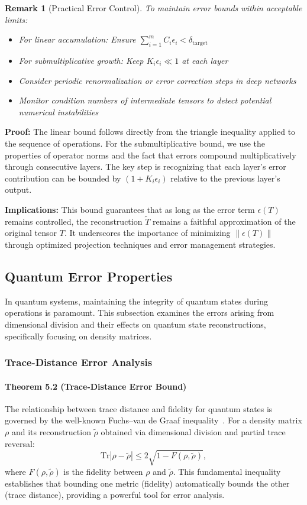 \documentclass[sn-mathphys-num]{sn-jnl}
\theoremstyle{thmstyleone}
\theoremstyle{thmstyletwo}
\newtheorem{remark}{Remark}
\theoremstyle{thmstylethree}
\begin{document}
\begin{remark}[Practical Error Control]
To maintain error bounds within acceptable limits:
\begin{itemize}
    \item For linear accumulation: Ensure $\sum_{i=1}^m C_i \epsilon_i < \delta_{\text{target}}$
    \item For submultiplicative growth: Keep $K_i\epsilon_i \ll 1$ at each layer
    \item Consider periodic renormalization or error correction steps in deep networks
    \item Monitor condition numbers of intermediate tensors to detect potential numerical instabilities
\end{itemize}
\end{remark}

\textbf{Proof:} The linear bound follows directly from the triangle inequality applied to the sequence of operations. For the submultiplicative bound, we use the properties of operator norms and the fact that errors compound multiplicatively through consecutive layers. The key step is recognizing that each layer's error contribution can be bounded by $(1 + K_i\epsilon_i)$ relative to the previous layer's output.

\textbf{Implications:} This bound guarantees that as long as the error term $\epsilon(T)$ remains controlled, the reconstruction $\tilde{T}$ remains a faithful approximation of the original tensor $T$. It underscores the importance of minimizing $\|\epsilon(T)\|$ through optimized projection techniques and error management strategies.

\subsection{Quantum Error Properties}

In quantum systems, maintaining the integrity of quantum states during operations is paramount. This subsection examines the errors arising from dimensional division and their effects on quantum state reconstructions, specifically focusing on density matrices.

\subsubsection{Trace-Distance Error Analysis}
\paragraph{Theorem 5.2 (Trace-Distance Error Bound)}
The relationship between trace distance and fidelity for quantum states is governed by the well-known Fuchs--van de Graaf inequality~\cite{fuchs1999cryptographic}. For a density matrix $\rho$ and its reconstruction $\tilde{\rho}$ obtained via dimensional division and partial trace reversal:
\[
\mathrm{Tr}|\rho - \tilde{\rho}| \leq 2 \sqrt{1 - F(\rho, \tilde{\rho})},
\]
where $F(\rho, \tilde{\rho})$ is the fidelity between $\rho$ and $\tilde{\rho}$. This fundamental inequality establishes that bounding one metric (fidelity) automatically bounds the other (trace distance), providing a powerful tool for error analysis.
\end{document}
